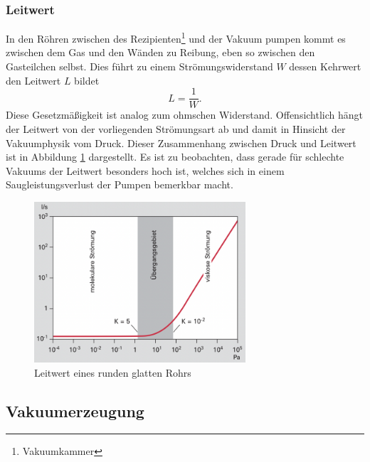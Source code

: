 \subsubsection{Leitwert}
In den Röhren zwischen des Rezipienten\footnote{Vakuumkammer} und der Vakuum pumpen kommt es zwischen dem Gas 
und den Wänden zu Reibung, eben so zwischen den Gasteilchen selbst.
Dies führt zu einem Strömungswiderstand $W$ dessen Kehrwert den Leitwert $L$ bildet
\begin{equation}
    L = \frac{1}{W}.
\end{equation}
Diese Gesetzmäßigkeit ist analog zum ohmschen Widerstand.
Offensichtlich hängt der Leitwert von der vorliegenden Strömungsart ab
und damit in Hinsicht der Vakuumphysik vom Druck.
Dieser Zusammenhang zwischen Druck und Leitwert ist in Abbildung \ref{fig:leitwert} dargestellt.
Es ist zu beobachten, dass gerade für schlechte Vakuums der Leitwert besonders hoch ist,
welches sich in einem Saugleistungsverlust der Pumpen bemerkbar macht.
\begin{figure}[h]
    \centering
    \includegraphics[width=0.7\textwidth]{abb/leitwert.png}
    \caption{Leitwert eines runden glatten Rohrs \cite{Pfeifer}} 
    \label{fig:leitwert}
\end{figure} 



\subsection{Vakuumerzeugung}
